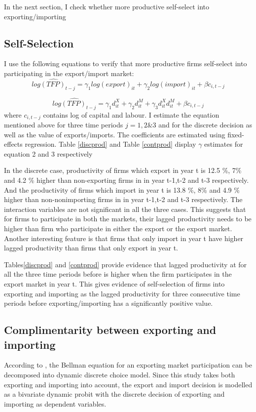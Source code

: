 \documentclass[11pt]{article}
\begin{document}
In the next section, I check whether more productive self-select into
exporting/importing 
\subsection{Self-Selection}
I use the following equations  to verify that more productive firms
self-select into participating in the export/import market:
\begin{equation}
\hat{log(TFP)_{t-j}} = \gamma_{1}log(export)_{it}+ \gamma_{2}log(import)_{it} +
 \beta c_{i,t-j}
\end{equation}

\begin{equation}
\hat{log(TFP)_{t-j}} = \gamma_{1}d_{it}^{X}+ \gamma_{2}d_{it}^{M} +
\gamma_{3}d_{it}^{X}d_{it}^{M} + \beta c_{i,t-j}
\end{equation}
where $c_{i,t-j}$ contains log of capital and labour. I estimate the
equation mentioned above for three time periods $j=1,2 \& 3$ and for
the discrete decision as well as the value of exports/imports.  The
coefficients are estimated using fixed-effects regression. 
Table \ref{discprod} and Table \ref{contprod} display  $\gamma$ estimates for equation 2 and 3
respectively
  


In the discrete case, productivity of firms which export in year t is
12.5 \%, 7\% and 4.2 \% higher than non-exporting firms in in year
t-1,t-2 and t-3 respectively. And the productivity of firms which
import in year t is 13.8 \%, 8\% and 4.9 \% higher than non-nonimporting firms in in year
t-1,t-2 and t-3 respectively. The interaction variables are
not significant in all the three cases. This suggests that for firms
to participate in both the markets, their lagged productivity needs to
be higher than firm who participate in either the export or the export
market. Another interesting feature is that firms that only import in
year t have higher lagged productivity than firms that only export in
year t.

Tables\ref{discprod} and  \ref{contprod} provide evidence that lagged productivity at for all the three
time periods before is higher when the firm participates in the export
market in year t. This gives evidence of self-selection of firms into
exporting and importing as the lagged productivity for three
consecutive time periods before exporting/importing has a
significantly positive value. 
\subsection{Complimentarity between exporting and importing}
According to \cite{roberts1997decision}, the Bellman equation for an
exporting market participation can be decomposed into dynamic discrete
choice model. Since this study takes both exporting and importing into
account, the export and import decision is modelled as a bivariate dynamic
probit  with the discrete decision of exporting and importing as
dependent variables.  
\end{document}
